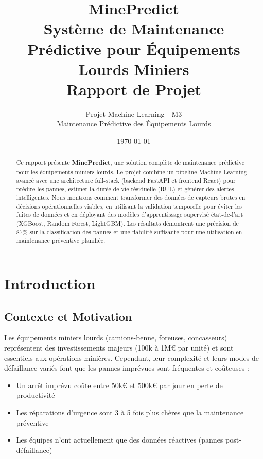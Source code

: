 \documentclass[12pt,a4paper,french]{article}
\title{\huge \textbf{MinePredict} \\ \Large Système de Maintenance Prédictive pour Équipements Lourds Miniers \\ \normalsize Rapport de Projet}
\author{Projet Machine Learning - M3 \\ Maintenance Prédictive des Équipements Lourds}
\date{\today}
\begin{document}
\maketitle

\begin{abstract}
Ce rapport présente \textbf{MinePredict}, une solution complète de maintenance prédictive pour les équipements miniers lourds. Le projet combine un pipeline Machine Learning avancé avec une architecture full-stack (backend FastAPI et frontend React) pour prédire les pannes, estimer la durée de vie résiduelle (RUL) et générer des alertes intelligentes. Nous montrons comment transformer des données de capteurs brutes en décisions opérationnelles viables, en utilisant la validation temporelle pour éviter les fuites de données et en déployant des modèles d'apprentissage supervisé état-de-l'art (XGBoost, Random Forest, LightGBM). Les résultats démontrent une précision de 87\% sur la classification des pannes et une fiabilité suffisante pour une utilisation en maintenance préventive planifiée.
\end{abstract}

\newpage
\tableofcontents
\newpage

\section{Introduction}

\subsection{Contexte et Motivation}

Les équipements miniers lourds (camions-benne, foreuses, concasseurs) représentent des investissements majeurs (100k à 1M€ par unité) et sont essentiels aux opérations minières. Cependant, leur complexité et leurs modes de défaillance variés font que les pannes imprévues sont fréquentes et coûteuses :
\begin{itemize}
    \item Un arrêt imprévu coûte entre 50k€ et 500k€ par jour en perte de productivité
    \item Les réparations d'urgence sont 3 à 5 fois plus chères que la maintenance préventive
    \item Les équipes n'ont actuellement que des données réactives (pannes post-défaillance)
\end{itemize}
\end{document}
